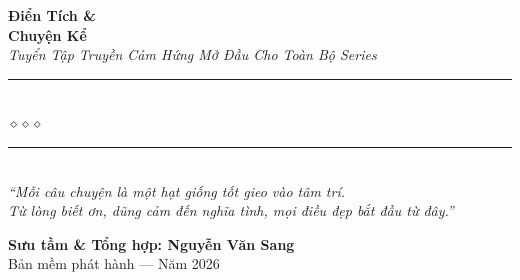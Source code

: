 \begin{titlepage}
\begin{center}
  {\fontsize{42}{50}\selectfont\bfseries\color{truyenred!80!black}
    Điển Tích \&}\\[0.4cm]
  {\fontsize{38}{45}\selectfont\bfseries\color{truyenred!80!black}
    Chuyện Kể}\\[0.8cm]

  {\fontsize{18}{22}\selectfont\color{truyengold!90!black}\itshape
    Tuyển Tập Truyền Cảm Hứng Mở Đầu Cho Toàn Bộ Series}\\[1cm]

  {\color{truyenblue!60}\rule{6cm}{1pt}}\\[5pt]
  {\color{truyengold!80!black}\large$\diamond$\hspace{1cm}$\diamond$\hspace{1cm}$\diamond$}\\[5pt]
  {\color{truyenblue!60}\rule{6cm}{1pt}}\\[1.5cm]

  {\normalsize\itshape\color{truyenblue!90!black}
   ``Mỗi câu chuyện là một hạt giống tốt gieo vào tâm trí.\\
   Từ lòng biết ơn, dũng cảm đến nghĩa tình, mọi điều đẹp bắt đầu từ đây.''}

  \vfill

  {\fontsize{16}{20}\selectfont\bfseries\color{truyenblue!90!black}
    Sưu tầm \& Tổng hợp: \textbf{Nguyễn Văn Sang}}\\[0.4cm]

  {\small\color{gray} Bản mềm phát hành --- Năm 2026}\\[0.5cm]
\end{center}

\afterpage{\nopagecolor}
\end{titlepage}
